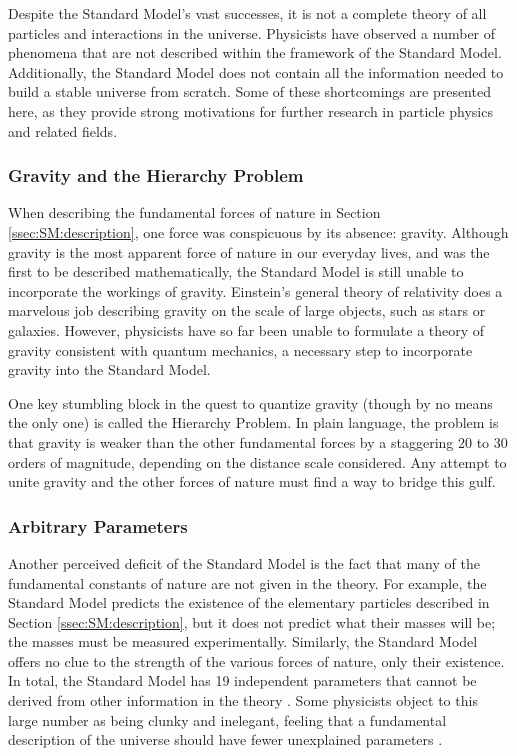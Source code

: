 Despite the Standard Model's vast successes, it is not a complete
theory of all particles and interactions in the universe. Physicists
have observed a number of phenomena that are not described within the
framework of the Standard Model. Additionally, the Standard Model does
not contain all the information needed to build a stable universe from
scratch. Some of these shortcomings are presented here, as they provide
strong motivations for further research in particle physics and
related fields.

\subsubsection*{Gravity and the Hierarchy Problem}
When describing the fundamental forces of nature in Section
\ref{ssec:SM:description}, one force was conspicuous by its absence:
gravity. Although gravity is the most apparent force of nature in our
everyday lives, and was the first to be described mathematically,
the Standard Model is still unable to incorporate the workings of
gravity. Einstein's general theory of relativity does a marvelous job
describing gravity on the scale of large objects, such as stars or
galaxies. However, physicists have so far been unable to formulate a
theory of gravity consistent with quantum mechanics, a necessary step
to incorporate gravity into the Standard Model.

One key stumbling block in the quest to quantize gravity (though by no
means the only one) is called the Hierarchy Problem. In plain language, the
problem is that gravity is weaker than the other fundamental forces by
a staggering 20 to 30 orders of magnitude, depending on the distance
scale considered. Any attempt to unite gravity and the other forces
of nature must find a way to bridge this gulf. %

\subsubsection*{Arbitrary Parameters}
Another perceived deficit of the Standard Model is the fact that many
of the fundamental constants of nature are not given in the theory. For
example, the Standard Model predicts the existence of the elementary
particles described in Section \ref{ssec:SM:description}, but it does
not predict what their masses will be;
the masses must be measured experimentally. Similarly, the Standard
Model offers no clue to the strength of the various forces of nature,
only their existence. In total, the Standard Model has 19 independent
parameters that cannot be derived from other information in the theory
\cite{smparams}. Some physicists object to this large number as being clunky
and inelegant, feeling that a fundamental description of the universe
should have fewer unexplained parameters \cite{griffiths}.

